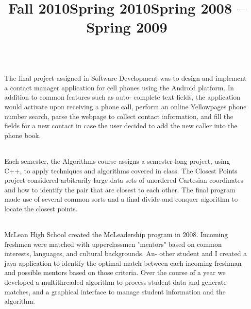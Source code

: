 \begin{resume}
\title{Fall 2010}
\dates{}
\begin{position}
\vspace{-10pt} \\
The final project assigned in Software Development was to design and implement a contact manager
application for cell phones using the Android platform. In addition to common features such as auto-
complete text fields, the application would activate upon receiving a phone call, perform an online
Yellowpages phone number search, parse the webpage to collect contact information, and fill the fields
for a new contact in case the user decided to add the new caller into the phone book.
\end{position}

\title{Spring 2010}
\dates{}
\begin{position}
\vspace{-10pt} \\
Each semester, the Algorithms course assigns a semester-long project, using C++, to apply techniques
and algorithms covered in class. The Closest Points project considered arbitrarily large data sets of
unordered Cartesian coordinates and how to identify the pair that are closest to each other. The final
program made use of several common sorts and a final divide and conquer algorithm to locate the
closest points.
\end{position}

\title{Spring 2008 -- Spring 2009}
\dates{}
\begin{position}
\vspace{-10pt}\\
McLean High School created the McLeadership program in 2008. Incoming freshmen were matched
with upperclassmen "mentors" based on common interests, languages, and cultural backgrounds. An-
other student and I created a java application to identify the optimal match between each incoming
freshman and possible mentors based on those criteria. Over the course of a year we developed a
multithreaded algorithm to process student data and generate matches, and a graphical interface to
manage student information and the algorithm.
\end{position}

\end{resume}

